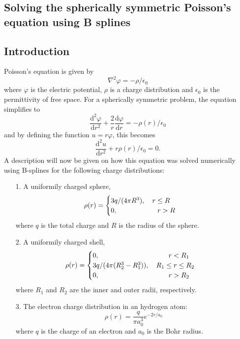 \documentclass[twocolumn]{article}
\begin{document}
\begin{large}
\section*{Solving the spherically symmetric Poisson's equation using B splines}
\subsection*{Introduction}
Poisson's equation is given by
\begin{equation}
    \nabla^2\varphi = -\rho/\epsilon_0
\end{equation}
where $\varphi$ is the electric potential, $\rho$ is a charge distribution and $\epsilon_0$ is the permittivity of free space. For a spherically symmetric problem, the equation simplifies to
\begin{equation}
    \frac{\text{d}^2\varphi}{\text{d}r^2}+\frac{2}{r}\frac{\text{d}\varphi}{\text{d}r} = -\rho(r)/\epsilon_0
\end{equation}
and by defining the function $u=r\varphi$, this becomes
\begin{equation}
    \label{12apr1845}
    \frac{\text{d}^2u}{\text{d}r^2} + r\rho(r)/\epsilon_0 = 0.
\end{equation}
A description will now be given on how this equation was solved numerically using B-splines for the following charge distributions:
\begin{itemize}
    \item[1.] A uniformily charged sphere, 
    \begin{equation}
        \rho(r) = 
        \begin{cases}
            3q/(4\pi R^3),\quad r\leq R \\ 
            0,\hspace{1.7cm}\quad r>R
        \end{cases}
    \end{equation}
    where $q$ is the total charge and $R$ is the radius of the sphere.
    \item[2.] A uniformily charged shell,
    \begin{equation}
        \rho(r) = 
        \begin{cases}
            0,\hspace{3.2cm}\quad r<R_1  \\ 
            3q/(4\pi (R_2^3-R_1^3)),\quad R_1\leq r\leq R_2 \\ 
            0,\hspace{3.2cm}\quad r>R_2
        \end{cases}
    \end{equation}
    where $R_1$ and $R_2$ are the inner and outer radii, respectively.
    \item[3.] The electron charge distribution in an hydrogen atom:
    \begin{equation}
        \rho(r) = \frac{q}{\pi a_0^3}e^{-2r/a_0}
    \end{equation}
    where $q$ is the charge of an electron and $a_0$ is the Bohr radius.
\end{itemize}



\end{large}
\end{document}
